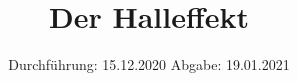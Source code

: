 

\subject{106}
\title{Der Halleffekt}
\date{%
  Durchführung: 15.12.2020
  \hspace{3em}
  Abgabe: 19.01.2021
}



\maketitle
\thispagestyle{empty}
\tableofcontents
\newpage







\printbibliography{}


